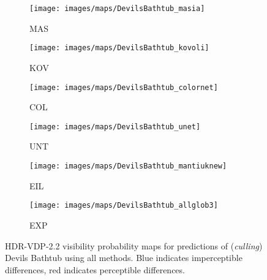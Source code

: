 \documentclass{egpubl}
\begin{document}
\begin{figure*}[htb]
\begin{subfigure}[t]{0.13\linewidth}
        \centering
        \texttt{[image: images/maps/DevilsBathtub\_masia]}
        \caption{MAS}
    \end{subfigure}
    \begin{subfigure}[t]{0.13\linewidth}
        \centering
        \texttt{[image: images/maps/DevilsBathtub\_kovoli]}
        \caption{KOV}
    \end{subfigure}
    \begin{subfigure}[t]{0.13\linewidth}
        \centering
        \texttt{[image: images/maps/DevilsBathtub\_colornet]}
        \caption{COL}
    \end{subfigure}
    \begin{subfigure}[t]{0.13\linewidth}
        \centering
        \texttt{[image: images/maps/DevilsBathtub\_unet]}
        \caption{UNT}
    \end{subfigure}
    \begin{subfigure}[t]{0.13\linewidth}
        \centering
        \texttt{[image: images/maps/DevilsBathtub\_mantiuknew]}
        \caption{EIL}
    \end{subfigure}
    \begin{subfigure}[t]{0.13\linewidth}
        \centering
        \texttt{[image: images/maps/DevilsBathtub\_allglob3]}
        \caption{EXP}
    \end{subfigure}
    \caption{HDR-VDP-2.2 visibility probability maps for predictions of
    (\textit{culling}) Devils Bathtub using all methods. Blue indicates
    imperceptible differences, red indicates perceptible
    differences.}\label{fig:mapsaverage}
\end{figure*} 
\end{document}
